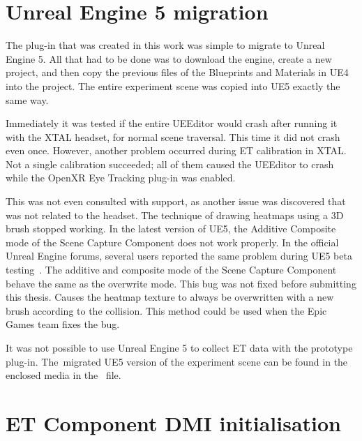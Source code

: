 \chapter{Unreal Engine 5 migration}
\label{appendix:UE5}

The plug-in that was created in this work was simple to migrate to Unreal Engine 5. All that had to be done was to download the engine, create a new project, and then copy the previous  files of the Blueprints and Materials in UE4 into the project. The entire experiment scene was copied into UE5 exactly the same way.

\bigskip{}
Immediately it was tested if the entire UEEditor would crash after running it with the XTAL headset, for normal scene traversal. This time it did not crash even once. However, another problem occurred during ET calibration in XTAL. Not a single calibration succeeded; all of them caused the UEEditor to crash while the OpenXR Eye Tracking plug-in was enabled. 

\bigskip{}
This was not even consulted with support, as another issue was discovered that was not related to the headset. The technique of drawing heatmaps using a 3D brush stopped working. In the latest version of UE5, the Additive Composite mode of the Scene Capture Component does not work properly. In the official Unreal Engine forums, several users reported the same problem during UE5 beta testing~\cite{unreal-forum}. The additive and composite mode of the Scene Capture Component behave the same as the overwrite mode. This bug was not fixed before submitting this thesis. Causes the heatmap texture to always be overwritten with a new brush according to the collision. This method could be used when the Epic Games team fixes the bug.

\bigskip{}
It was not possible to use Unreal Engine 5 to collect ET data with the prototype plug-in. The~migrated UE5 version of the experiment scene can be found in the enclosed media in the~ file.

\chapter{ET Component DMI initialisation}
\label{appendix:ETcomponent}

